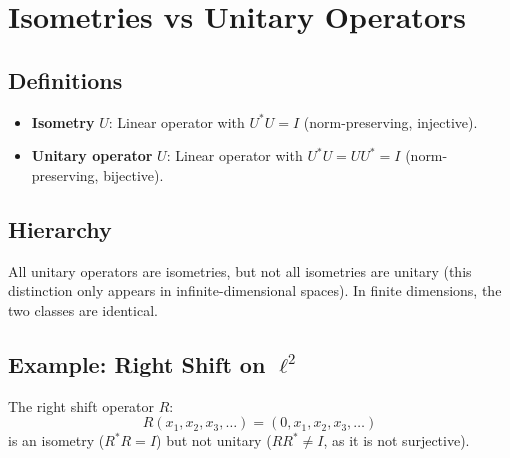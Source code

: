 \documentclass{article}
\begin{document}
\section{Isometries vs Unitary Operators}
\subsection{Definitions}
\begin{itemize}
    \item \textbf{Isometry} $U$: Linear operator with $U^*U = I$ (norm-preserving, injective).
    \item \textbf{Unitary operator} $U$: Linear operator with $U^*U = UU^* = I$ (norm-preserving, bijective).
\end{itemize}

\subsection{Hierarchy}
All unitary operators are isometries, but not all isometries are unitary (this distinction only appears in infinite-dimensional spaces). In finite dimensions, the two classes are identical.

\subsection{Example: Right Shift on $\ell^2$}
The right shift operator $R$:
\[
R(x_1, x_2, x_3, \dots) = (0, x_1, x_2, x_3, \dots)
\]
is an isometry ($R^*R = I$) but not unitary ($RR^* \neq I$, as it is not surjective).
\end{document}

